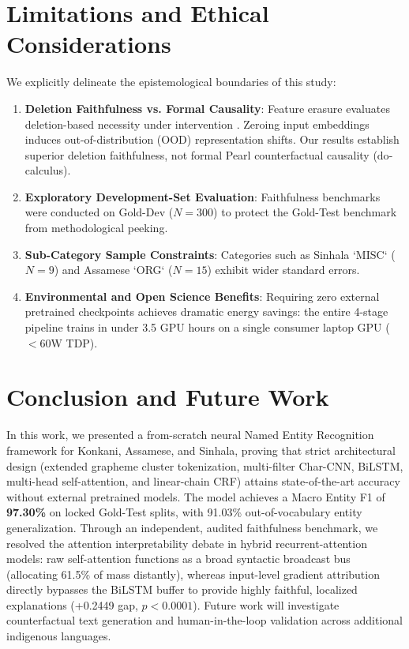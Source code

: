 \documentclass[default,iicol]{sn-jnl}
\begin{document}
\section{Limitations and Ethical Considerations}\label{sec8}

We explicitly delineate the epistemological boundaries of this study:
\begin{enumerate}
    \item \textbf{Deletion Faithfulness vs. Formal Causality}: Feature erasure evaluates deletion-based necessity under intervention \cite{hooker2019benchmark}. Zeroing input embeddings induces out-of-distribution (OOD) representation shifts. Our results establish superior deletion faithfulness, not formal Pearl counterfactual causality ($\text{do}$-calculus).
    \item \textbf{Exploratory Development-Set Evaluation}: Faithfulness benchmarks were conducted on Gold-Dev ($N=300$) to protect the Gold-Test benchmark from methodological peeking.
    \item \textbf{Sub-Category Sample Constraints}: Categories such as Sinhala `MISC` ($N=9$) and Assamese `ORG` ($N=15$) exhibit wider standard errors.
    \item \textbf{Environmental and Open Science Benefits}: Requiring zero external pretrained checkpoints achieves dramatic energy savings: the entire 4-stage pipeline trains in under 3.5 GPU hours on a single consumer laptop GPU ($<60\text{W}$ TDP).
\end{enumerate}

\section{Conclusion and Future Work}\label{sec9}

In this work, we presented a from-scratch neural Named Entity Recognition framework for Konkani, Assamese, and Sinhala, proving that strict architectural design (extended grapheme cluster tokenization, multi-filter Char-CNN, BiLSTM, multi-head self-attention, and linear-chain CRF) attains state-of-the-art accuracy without external pretrained models. The model achieves a Macro Entity F1 of \textbf{97.30\%} on locked Gold-Test splits, with 91.03\% out-of-vocabulary entity generalization. Through an independent, audited faithfulness benchmark, we resolved the attention interpretability debate in hybrid recurrent-attention models: raw self-attention functions as a broad syntactic broadcast bus (allocating 61.5\% of mass distantly), whereas input-level gradient attribution directly bypasses the BiLSTM buffer to provide highly faithful, localized explanations (+0.2449 gap, $p < 0.0001$). Future work will investigate counterfactual text generation and human-in-the-loop validation across additional indigenous languages.
\end{document}
